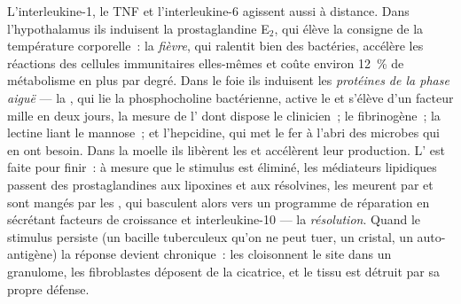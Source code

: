 \begin{proposition}\label{prop:b3:innate-immunity:systemic}
L'interleukine-1, le TNF et l'interleukine-6 agissent aussi à distance.
Dans l'hypothalamus ils induisent la prostaglandine E$_{2}$, qui élève
la consigne de la température corporelle~: la \emph{fièvre}, qui
ralentit bien des bactéries, accélère les réactions des cellules
immunitaires elles-mêmes et coûte environ \qty{12}{\%} de métabolisme en
plus par degré. Dans le foie ils induisent les \emph{protéines de la
phase aiguë} --- la , qui lie la phosphocholine
bactérienne, active le  et s'élève d'un facteur mille en deux
jours, la mesure de l' dont dispose le clinicien~; le
fibrinogène~; la lectine liant le mannose~; et l'hepcidine, qui met le
fer à l'abri des microbes qui en ont besoin. Dans la moelle ils libèrent
les  et accélèrent leur production. L' est faite
pour finir~: à mesure que le stimulus est éliminé, les médiateurs
lipidiques passent des prostaglandines aux lipoxines et aux résolvines,
les  meurent par  et sont mangés par les ,
qui basculent alors vers un programme de réparation en sécrétant
facteurs de croissance et interleukine-10 --- la \emph{résolution}.
Quand le stimulus persiste (un bacille tuberculeux qu'on ne peut tuer,
un cristal, un auto-antigène) la réponse devient chronique~: les
 cloisonnent le site dans un granulome, les fibroblastes
déposent de la cicatrice, et le tissu est détruit par sa propre défense.
\end{proposition}

